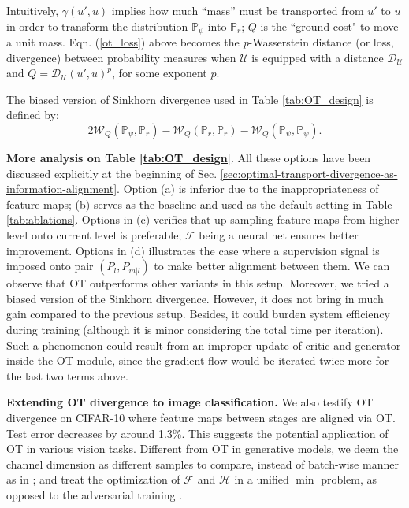 \documentclass{article} \usepackage{iclr2019_conference,times}
\begin{document}
Intuitively, $\gamma(u', u)$ implies how much ``mass'' must be transported from $u'$ to $u$ in order to transform the distribution $\mathds{P}_\psi$ into  $\mathds{P}_r$; $Q$ is the ``ground cost" to move a unit mass. Eqn. (\ref{ot_loss}) above becomes the \textit{p}-Wasserstein distance (or loss, divergence) between probability measures when $\mathcal{U}$ is equipped with a distance $\mathcal{D}_{\mathcal{U}}$ and $Q=\mathcal{D}_{\mathcal{U}}(u', u)^p$, for some exponent $p$.



The biased version of Sinkhorn divergence used in Table \ref{tab:OT_design} is defined by:
\begin{equation*}
2\mathcal{W}_{Q}(  \mathds{P}_\psi, \mathds{P}_r  ) - \mathcal{W}_{Q}(  \mathds{P}_r, \mathds{P}_r  ) - \mathcal{W}_{Q}(  \mathds{P}_\psi, \mathds{P}_\psi  ).  
\nonumber
\end{equation*} 


\textbf{More analysis on Table \ref{tab:OT_design}}.
All these options have been discussed explicitly at the beginning of Sec. \ref{sec:optimal-transport-divergence-as-information-alignment}.
Option (a) is inferior due to the inappropriateness of feature maps; (b) serves as the baseline and used as the default setting in Table \ref{tab:ablations}.
Options in (c) verifies that up-sampling feature maps from higher-level onto current level is preferable; $\mathcal{F}$ being a neural net ensures better improvement.
Options in (d) illustrates the case where a supervision signal is imposed onto pair $(P_l, P_{m|l})$ to make better alignment between them.
We can observe that OT outperforms other variants in this setup. Moreover, we tried a biased version \citep{genevay2017_sinkhorn_loss} of the Sinkhorn divergence.
However, it does not bring in much gain compared to the previous setup. Besides, it could burden system efficiency during training (although it is minor considering the total time per iteration). Such a phenomenon could result from an improper update of critic and generator inside the OT module, since the gradient flow would be iterated twice more for the last two terms above.






\textbf{Extending OT divergence to image classification.} We also testify OT divergence on CIFAR-10 \citep{cifar} where feature maps between stages 
are aligned via OT. 
Test error decreases by around 1.3\%. This suggests the potential application of OT in various vision tasks.
Different from OT in generative models, we deem the channel dimension as different samples to compare, instead of batch-wise manner as in \citep{salimans2018improving}; and treat the optimization of $\mathcal{F}$ and $\mathcal{H}$ in a unified $\min$ problem, as opposed to the adversarial training \citep{genevay2017_sinkhorn_loss}.
\end{document}
